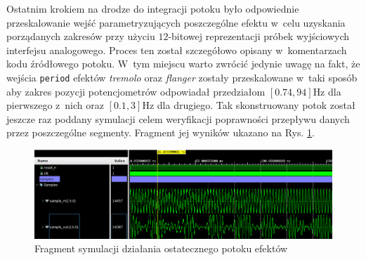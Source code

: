 Ostatnim krokiem na drodze do integracji potoku było odpowiednie przeskalowanie wejść parametryzujących poszczególne efektu w~celu uzyskania porządanych zakresów przy użyciu $12$-bitowej reprezentacji próbek wyjściowych interfejsu analogowego. Proces ten został szczegółowo opisany w~komentarzach kodu źródłowego potoku. W~tym miejscu warto zwrócić jedynie uwagę na fakt, że wejścia \verb|period| efektów \textit{tremolo} oraz \textit{flanger} zostały przeskalowane w~taki sposób aby zakres pozycji potencjometrów odpowiadał przedziałom $[0.74,94]$Hz dla pierwszego z~nich oraz $[0.1,3]$Hz dla drugiego. Tak skonstruowany potok został jeszcze raz poddany symulacji celem weryfikacji poprawności przepływu danych przez poszczególne segmenty. Fragment jej wyników ukazano na Rys. \ref{sim-pipe}.

\vspace{1cm}
\begin{figure}[ht]
    \centering
    \includegraphics[width=\textwidth]{img/sim/pipe_sim.png}
    \captionsetup{format=plain,justification=centering}
    \caption{Fragment symulacji działania ostatecznego potoku efektów}
    \label{sim-pipe}
\end{figure}
\vspace{0.5cm}

